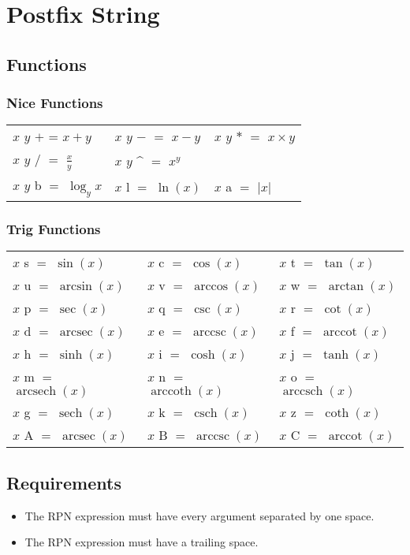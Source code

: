 \documentclass{article}
\DeclareMathOperator{\arcsec}{arcsec}
\DeclareMathOperator{\arccot}{arccot}
\DeclareMathOperator{\arccsc}{arccsc}
\DeclareMathOperator{\arcsinh}{arcsech}
\DeclareMathOperator{\arccosh}{arccoth}
\DeclareMathOperator{\arctanh}{arccsch}
\DeclareMathOperator{\sech}{sech}
\DeclareMathOperator{\csch}{csch}
\begin{document}
\section{Postfix String}
\subsection{Functions}
{\doublespacing
\subsubsection{Nice Functions}
\begin{tabular}{lll}
$x$ $y$ $+$ = $x + y$ & $x$ $y$ $-$ $=$ $x - y$ & $x$ $y$ $*$ $=$ $x \times y$\\
$x$ $y$ $/$ $=$ $\frac{x}{y}$&$x$ $y$ \^{} $=$ $x^y$&\\
$x$ $y$ b $=$ $\log_y{x}$&$x$ l $=$ $\ln(x)$& $x$ a $=$ $|x|$\\
\end{tabular}
\subsubsection{Trig Functions}
\begin{tabular}{lll}
$x$ s $=$ $\sin(x)$&$x$ c $=$ $\cos(x)$& $x$ t $=$ $\tan(x)$\\
$x$ u $=$ $\arcsin(x)$&$x$ v $=$ $\arccos(x)$& $x$ w $=$ $\arctan(x)$\\
$x$ p $=$ $\sec(x)$&$x$ q $=$ $\csc(x)$& $x$ r $=$ $\cot(x)$\\
$x$ d $=$ $\arcsec(x)$&$x$ e $=$ $\arccsc(x)$& $x$ f $=$ $\arccot(x)$\\
$x$ h $=$ $\sinh(x)$&$x$ i $=$ $\cosh(x)$& $x$ j $=$ $\tanh(x)$\\
$x$ m $=$ $\arcsinh(x)$&$x$ n $=$ $\arccosh(x)$& $x$ o $=$ $\arctanh(x)$\\
$x$ g $=$ $\sech(x)$&$x$ k $=$ $\csch(x)$& $x$ z $=$ $\coth(x)$\\
$x$ A $=$ $\arcsec(x)$&$x$ B $=$ $\arccsc(x)$& $x$ C $=$ $\arccot(x)$\\
\end{tabular}
}\subsection{Requirements}{
\begin{itemize}
\item{The RPN expression must have every argument separated by one space.}
\item{The RPN expression must have a trailing space.}
\end{itemize}
}
\end{document}
